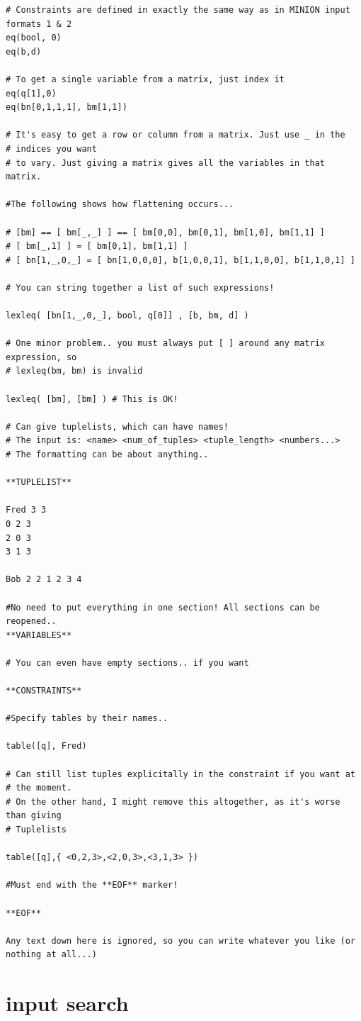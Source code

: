\documentclass[oneside]{book}
\begin{document}
{\begin{verbatim}
# Constraints are defined in exactly the same way as in MINION input
formats 1 & 2
eq(bool, 0)
eq(b,d)

# To get a single variable from a matrix, just index it
eq(q[1],0)
eq(bn[0,1,1,1], bm[1,1])

# It's easy to get a row or column from a matrix. Just use _ in the
# indices you want
# to vary. Just giving a matrix gives all the variables in that matrix.

#The following shows how flattening occurs...

# [bm] == [ bm[_,_] ] == [ bm[0,0], bm[0,1], bm[1,0], bm[1,1] ]
# [ bm[_,1] ] = [ bm[0,1], bm[1,1] ]
# [ bn[1,_,0,_] = [ bn[1,0,0,0], b[1,0,0,1], b[1,1,0,0], b[1,1,0,1] ]

# You can string together a list of such expressions!

lexleq( [bn[1,_,0,_], bool, q[0]] , [b, bm, d] )

# One minor problem.. you must always put [ ] around any matrix expression, so
# lexleq(bm, bm) is invalid

lexleq( [bm], [bm] ) # This is OK!

# Can give tuplelists, which can have names!
# The input is: <name> <num_of_tuples> <tuple_length> <numbers...>
# The formatting can be about anything..

**TUPLELIST**

Fred 3 3
0 2 3
2 0 3
3 1 3

Bob 2 2 1 2 3 4

#No need to put everything in one section! All sections can be reopened..
**VARIABLES**

# You can even have empty sections.. if you want

**CONSTRAINTS**

#Specify tables by their names..

table([q], Fred)

# Can still list tuples explicitally in the constraint if you want at
# the moment.
# On the other hand, I might remove this altogether, as it's worse than giving
# Tuplelists

table([q],{ <0,2,3>,<2,0,3>,<3,1,3> })

#Must end with the **EOF** marker!

**EOF**

Any text down here is ignored, so you can write whatever you like (or
nothing at all...)
\end{verbatim}
}
\section{input search}
\end{document}
